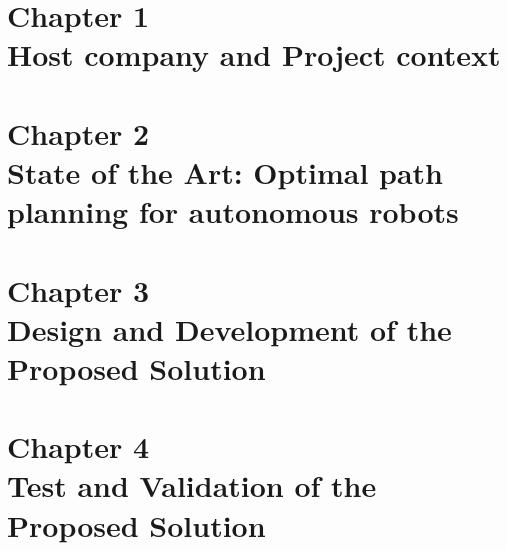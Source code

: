 \documentclass[a4paper,12pt,oneside]{report}
\begin{document}





\tableofcontents
\listoffigures
\listoftables




\pagestyle{fancy}

\newpage
{}



\part*{Chapter 1 \\Host company and Project context}

\part*{Chapter 2 \\State of the Art: Optimal path planning for autonomous robots}

\part*{Chapter 3 \\Design and Development of the
Proposed Solution}

\part*{Chapter 4 \\ Test and Validation of the Proposed Solution}

% 

\fancyhead[R]{}





\newpage

\end{document}
